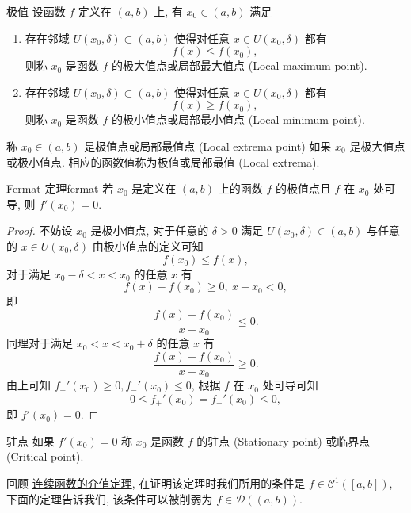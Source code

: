 \documentclass[cn,toc=twocol]{elegantbook}
\newcommand{\ITEMS}{\begin{enumerate}}
\newcommand{\ITEME}{\end{enumerate}}
\newcommand{\D}{\mathscr{D}}
\begin{document}
\begin{definition}{极值}
	设函数 $f$ 定义在 $(a,b)$ 上, 有 $x_0 \in (a,b)$ 满足
	\ITEMS
		\item 存在邻域 $U(x_0,\delta) \subset (a,b)$ 使得对任意 $x \in U(x_0,\delta)$ 都有
		\[
			f(x) \le f(x_0),
		\]
		则称 $x_0$ 是函数 $f$ 的极大值点或局部最大值点 (Local maximum point).
		
		\item 存在邻域 $U(x_0,\delta) \subset (a,b)$ 使得对任意 $x \in U(x_0,\delta)$ 都有
		\[
			f(x) \ge f(x_0),
		\]
		则称 $x_0$ 是函数 $f$ 的极小值点或局部最小值点 (Local minimum point).
	\ITEME
	
	称 $x_0 \in (a,b)$ 是极值点或局部最值点 (Local extrema point) 如果 $x_0$ 是极大值点或极小值点. 相应的函数值称为极值或局部最值 (Local extrema).
\end{definition}

\begin{theorem}{Fermat 定理}{fermat}
	若 $x_0$ 是定义在 $(a,b)$ 上的函数 $f$ 的极值点且 $f$ 在 $x_0$ 处可导, 则 $f′(x_0) = 0$.
\end{theorem}
\begin{proof}
	不妨设 $x_0$ 是极小值点, 对于任意的 $\delta > 0$ 满足 $U(x_0,\delta) \in (a,b)$ 与任意的 $x \in U(x_0,\delta)$ 由极小值点的定义可知
	\[
		f(x_0) \le f(x),
	\]
	对于满足 $x_0 - \delta < x < x_0$ 的任意 $x$ 有
	\[
		f(x) - f(x_0) \ge 0,\ x - x_0 < 0,
	\]
	即
	\[
		\frac{f(x) - f(x_0)}{x - x_0} \le 0.
	\]
	同理对于满足 $x_0 < x < x_0 + \delta$ 的任意 $x$ 有
	\[
		\frac{f(x) - f(x_0)}{x - x_0} \ge 0.
	\]
	由上可知 $f_+'(x_0) \ge 0, f_-'(x_0) \le 0$, 根据 $f$ 在 $x_0$ 处可导可知
	\[
		0 \le f_+'(x_0) = f_-'(x_0) \le 0,
	\]
	即 $f'(x_0) = 0$.
\end{proof}

\begin{definition}{驻点}
	如果 $f′(x_0) = 0$ 称 $x_0$ 是函数 $f$ 的驻点 (Stationary point) 或临界点 (Critical point).
\end{definition}

\vspace{0.5em}

回顾 \hyperref[thm_C_p4]{连续函数的介值定理}, 在证明该定理时我们所用的条件是 $f \in \mathscr{C}^{1}([a,b])$, 下面的定理告诉我们, 该条件可以被削弱为 $f \in \D((a,b))$.
\end{document}
